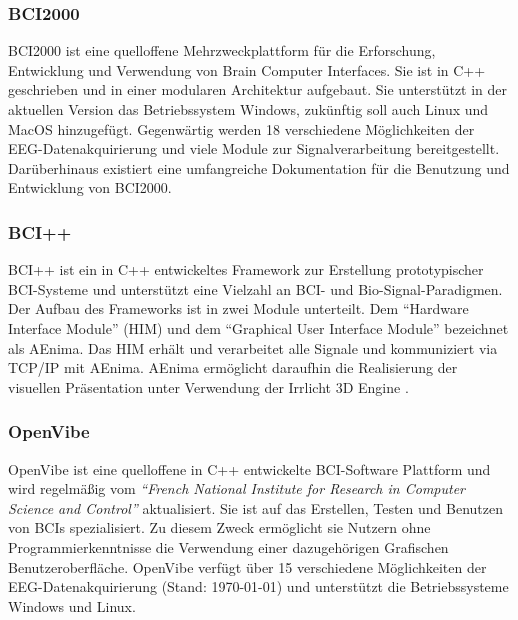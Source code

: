 \subsubsection{BCI2000}
\acs{BCI2000} \cite{BCI2000Online} ist eine quelloffene Mehrzweckplattform für die Erforschung, Entwicklung und Verwendung von Brain Computer Interfaces. Sie ist in C++ geschrieben und in einer modularen Architektur aufgebaut. 
Sie unterstützt in der aktuellen Version das Betriebssystem Windows, zukünftig soll auch Linux und MacOS hinzugefügt.
Gegenwärtig werden 18 verschiedene Möglichkeiten der EEG-Datenakquirierung und viele Module zur Signalverarbeitung bereitgestellt. 
Darüberhinaus existiert eine umfangreiche Dokumentation für die Benutzung und Entwicklung von \acs{BCI2000}.\\


\subsubsection{BCI++}
BCI++ \cite{BCI++Online} ist ein in C++ entwickeltes Framework zur Erstellung prototypischer \acs{BCI}-Systeme und unterstützt eine Vielzahl an BCI- und Bio-Signal-Paradigmen. 
Der Aufbau des Frameworks ist in zwei Module unterteilt. Dem "`Hardware Interface Module"' (\acs{HIM}) und dem "`Graphical User Interface Module"' bezeichnet als \acs{AEnima}.
Das \acs{HIM} erhält und verarbeitet alle Signale und kommuniziert via TCP/IP mit \acs{AEnima}. 
\acs{AEnima} ermöglicht daraufhin die Realisierung der visuellen Präsentation unter Verwendung der Irrlicht 3D Engine \cite{IrrlichtOnline}. \\


\subsubsection{OpenVibe}
OpenVibe \cite{OpenVibeOnline} ist eine quelloffene in C++ entwickelte BCI-Software Plattform und wird regelmäßig vom \textit{"`French National Institute for Research in Computer Science and Control"'} aktualisiert. 
Sie ist auf das Erstellen, Testen und Benutzen von BCIs spezialisiert.
Zu diesem Zweck ermöglicht sie Nutzern ohne Programmierkenntnisse die Verwendung einer dazugehörigen Grafischen Benutzeroberfläche. 
OpenVibe verfügt über 15 verschiedene Möglichkeiten der EEG-Datenakquirierung (Stand: \today) und unterstützt die Betriebssysteme Windows und Linux.\\


